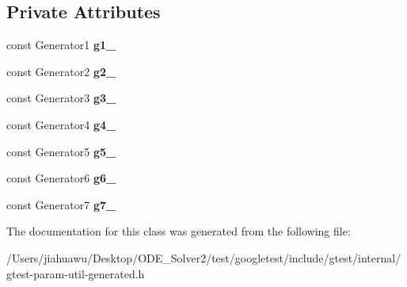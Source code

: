 \subsection*{Private Attributes}
\begin{DoxyCompactItemize}
\item 
\mbox{\label{classtesting_1_1internal_1_1_cartesian_product_holder7_adcf0358076c8e289e15a9f57e43eee1f}} 
const Generator1 {\bfseries g1\+\_\+}
\item 
\mbox{\label{classtesting_1_1internal_1_1_cartesian_product_holder7_a704f651db08383a13d28d07266cd33c3}} 
const Generator2 {\bfseries g2\+\_\+}
\item 
\mbox{\label{classtesting_1_1internal_1_1_cartesian_product_holder7_a1f5af59a8847a143da8b309a6a541add}} 
const Generator3 {\bfseries g3\+\_\+}
\item 
\mbox{\label{classtesting_1_1internal_1_1_cartesian_product_holder7_aff48909c84b414d8b8e5d04ef93c953f}} 
const Generator4 {\bfseries g4\+\_\+}
\item 
\mbox{\label{classtesting_1_1internal_1_1_cartesian_product_holder7_af6fa2bc63f60900a73037480cb7bc177}} 
const Generator5 {\bfseries g5\+\_\+}
\item 
\mbox{\label{classtesting_1_1internal_1_1_cartesian_product_holder7_a291561ee8d2316dab94ebe6f2efb2f7d}} 
const Generator6 {\bfseries g6\+\_\+}
\item 
\mbox{\label{classtesting_1_1internal_1_1_cartesian_product_holder7_a61473c49fc8b1dec59ffb31a5295e05c}} 
const Generator7 {\bfseries g7\+\_\+}
\end{DoxyCompactItemize}


The documentation for this class was generated from the following file\+:\begin{DoxyCompactItemize}
\item 
/\+Users/jiahuawu/\+Desktop/\+O\+D\+E\+\_\+\+Solver2/test/googletest/include/gtest/internal/gtest-\/param-\/util-\/generated.\+h\end{DoxyCompactItemize}
